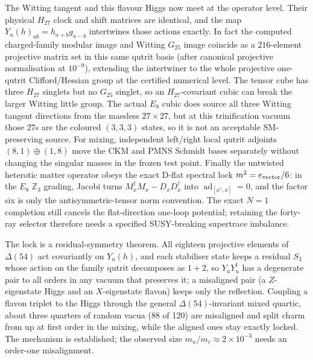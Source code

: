 The Witting tangent and this flavour Higgs now meet at the operator level.  Their physical $H_{27}$ clock and shift
matrices are identical, and the map $Y_u(h)_{ab}=h_{a+b}g_{a-b}$ intertwines those actions exactly.  In fact the
computed charged-family modular image and Witting $G_{25}$ image coincide as a $216$-element projective matrix set in
this same qutrit basis (after canonical projective normalisation at $10^{-9}$), extending the intertwiner to the whole
projective one-qutrit Clifford/Hessian group at the certified numerical level.  The tensor cube
has three $H_{27}$ singlets but no $G_{25}$ singlet, so an $H_{27}$-covariant cubic can break the larger Witting little
group.  The actual $E_8$ cubic does source all three Witting tangent directions from the massless $27\times27$, but at
this trinification vacuum those $27$s are the coloured $(3,3,3)$ states, so it is not an acceptable SM-preserving source.
For mixing, independent left/right local qutrit adjoints $(8,1)\oplus(1,8)$ move the CKM and PMNS Schmidt bases
separately without changing the singular masses in the frozen test point.  Finally the untwisted heterotic matter
operator obeys the exact D-flat spectral lock $m^2=e_{\rm vector}/6$: in the $E_8$ $\mathbb Z_3$ grading, Jacobi turns
$M_x^\dagger M_x-D_xD_x^\dagger$ into $\operatorname{ad}_{[x^\dagger,x]}=0$, and the factor six is only the
antisymmetric-tensor norm convention.  The exact $N=1$ completion still cancels the flat-direction one-loop potential;
retaining the forty-ray selector therefore needs
a specified SUSY-breaking supertrace imbalance. 

The lock is a residual-symmetry theorem. All eighteen projective elements of $\Delta(54)$ act covariantly on $Y_u(h)$, and each stabiliser state keeps a residual $S_3$ whose action on the family qutrit decomposes as $1+2$, so $Y_uY_u^\dagger$ has a degenerate pair to all orders in any vacuum that preserves it; a misaligned pair (a $Z$-eigenstate Higgs and an $X$-eigenstate flavon) keeps only the reflection. Coupling a flavon triplet to the Higgs through the general $\Delta(54)$-invariant mixed quartic, about three quarters of random vacua (88 of 120) are misaligned and split charm from up at first order in the mixing, while the aligned ones stay exactly locked. The mechanism is established; the observed size $m_u/m_c\approx2\times10^{-3}$ needs an order-one misalignment. 

